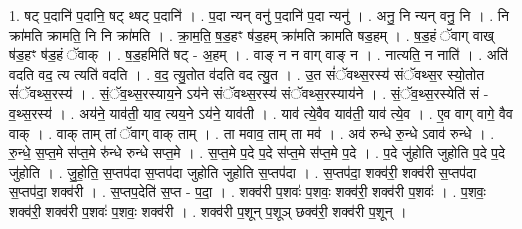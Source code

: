 \documentclass[17pt]{extarticle}
\begin{document}
1. षट् प॒दानि॑ प॒दानि॒ षट् थ्षट् प॒दानि॑ । . प॒दा न्यन् वनु॑ प॒दानि॑ प॒दा न्यनु॑ । . अनु॒ नि न्यन् वनु॒ नि । . नि क्रा॑मति क्रामति॒ नि नि क्रा॑मति । . क्रा॒म॒ति॒ ष॒ड॒हꣳ ष॑ड॒हम् क्रा॑मति क्रामति षड॒हम् । . ष॒ड॒हं ॅवाग् वाख् ष॑ड॒हꣳ ष॑ड॒हं ॅवाक् । . ष॒ड॒हमिति॑ षट् - अ॒हम् । . वाङ् न न वाग् वाङ् न । . नात्यति॒ न नाति॑ । . अति॑ वदति वद॒ त्य त्यति॑ वदति । . व॒द॒ त्यु॒तोत व॑दति वद त्यु॒त । . उ॒त सं॑ॅवथ्स॒रस्य॑ संॅवथ्स॒र स्यो॒तोत सं॑ॅवथ्स॒रस्य॑ । . सं॒ॅव॒थ्स॒रस्याय॒ने ऽय॑ने संॅवथ्स॒रस्य॑ संॅवथ्स॒रस्याय॑ने । . सं॒ॅव॒थ्स॒रस्येति॑ सं - व॒थ्स॒रस्य॑ । . अय॑ने॒ याव॑ती॒ याव॒ त्यय॒ने ऽय॑ने॒ याव॑ती । . याव॑ त्ये॒वैव याव॑ती॒ याव॑ त्ये॒व । . ए॒व वाग् वागे॒ वैव वाक् । . वाक् ताम् तां ॅवाग् वाक् ताम् । . ता मवाव॒ ताम् ता मव॑ । . अव॑ रुन्धे रु॒न्धे ऽवाव॑ रुन्धे । . रु॒न्धे॒ स॒प्त॒मे स॑प्त॒मे रु॑न्धे रुन्धे सप्त॒मे । . स॒प्त॒मे प॒दे प॒दे स॑प्त॒मे स॑प्त॒मे प॒दे । . प॒दे जु॑होति जुहोति प॒दे प॒दे जु॑होति । . जु॒हो॒ति॒ स॒प्तप॑दा स॒प्तप॑दा जुहोति जुहोति स॒प्तप॑दा । . स॒प्तप॑दा॒ शक्व॑री॒ शक्व॑री स॒प्तप॑दा स॒प्तप॑दा॒ शक्व॑री । . स॒प्तप॒देति॑ स॒प्त - प॒दा॒ । . शक्व॑री प॒शवः॑ प॒शवः॒ शक्व॑री॒ शक्व॑री प॒शवः॑ । . प॒शवः॒ शक्व॑री॒ शक्व॑री प॒शवः॑ प॒शवः॒ शक्व॑री । . शक्व॑री प॒शून् प॒शूञ् छक्व॑री॒ शक्व॑री प॒शून् । \newline
\end{document}
